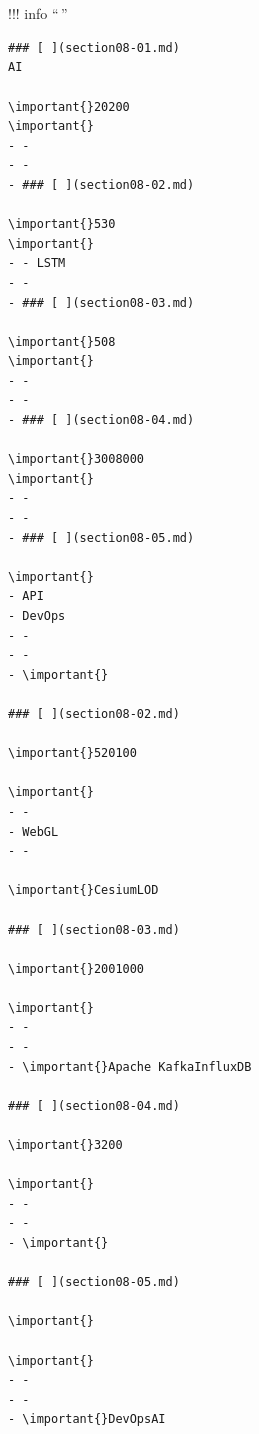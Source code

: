\hypertarget{section}{%
\section{}\label{section}}


\hypertarget{section-1}{%
\subsection{}\label{section-1}}

\important{}

\important{}

\important{}

\important{}

\important{}

\hypertarget{section-2}{%
\subsection{}\label{section-2}}

!!! info ``\,''

\begin{verbatim}
### [ ](section08-01.md)
AI

\important{}20200
\important{}
- -   
- - 
- ### [ ](section08-02.md)

\important{}530
\important{}
- - LSTM
- - 
- ### [ ](section08-03.md)

\important{}508
\important{}
- - 
- - 
- ### [ ](section08-04.md)

\important{}3008000
\important{}
- - 
- - 
- ### [ ](section08-05.md)

\important{}
- API
- DevOps
- - 
- - 
- \important{}

### [ ](section08-02.md)

\important{}520100

\important{}
- - 
- WebGL
- - 

\important{}CesiumLOD

### [ ](section08-03.md)

\important{}2001000

\important{}
- - 
- - 
- \important{}Apache KafkaInfluxDB

### [ ](section08-04.md)

\important{}3200

\important{}
- - 
- - 
- \important{}

### [ ](section08-05.md)

\important{}

\important{}
- - 
- - 
- \important{}DevOpsAI
\end{verbatim}

